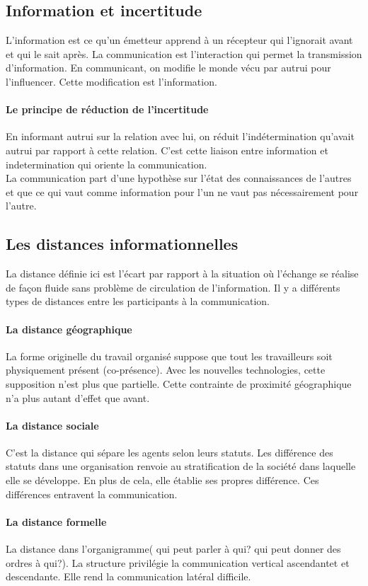 \documentclass[11pt]{article} %
\begin{document}
	\subsection{Information et incertitude}
		L'information est ce qu'un émetteur apprend à un récepteur qui l'ignorait avant et qui le sait après. La
		communication est l'interaction qui permet la transmission d'information. En communicant, on modifie 
		le monde vécu par autrui pour l'influencer. Cette modification est l'information.
		\paragraph{Le principe de réduction de l'incertitude} En informant autrui sur la relation avec lui, on 
		réduit l'indétermination qu'avait autrui par rapport à cette relation. C'est cette liaison entre information 
		et indetermination qui oriente la communication.\\
		La communication part d'une hypothèse sur l'état des connaissances de l'autres et que ce qui vaut 
		comme information pour l'un ne vaut pas nécessairement pour l'autre.
	\subsection{Les distances informationnelles}
		La distance définie ici est l'écart par rapport à la situation où l'échange se réalise de façon fluide
		sans problème de circulation de l'information. Il y a différents types de distances entre les participants 
		à la communication. 
		\paragraph{La distance géographique} La forme originelle du travail organisé suppose que tout les 
		travailleurs soit physiquement présent (co-présence). Avec les nouvelles technologies, cette supposition 
		n'est plus que partielle. Cette contrainte de proximité géographique n'a plus autant d'effet que avant.
		\paragraph{La distance sociale} C'est la distance qui sépare les agents selon leurs statuts. Les 
		différence des statuts dans une organisation renvoie au stratification de la société dans laquelle elle se 
		développe. En plus de cela, elle établie ses propres différence. Ces différences entravent la 
		communication.
		\paragraph{La distance formelle} La distance dans l'organigramme( qui peut parler à qui? qui peut 
		donner des ordres à qui?). La structure privilégie la communication vertical ascendantet et 
		descendante. Elle rend la communication latéral difficile.
\end{document}
